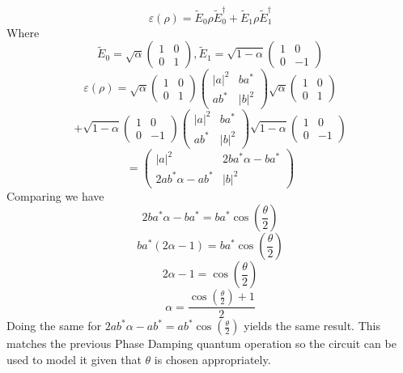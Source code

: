 \documentclass[12pt]{article}
\begin{document}
\begin{enumerate}
    $$ \varepsilon (\rho) = \tilde{E}_0 \rho \tilde{E}^{\dagger}_0 + \tilde{E}_1 \rho \tilde{E}_1^{\dagger} $$
    Where 
    $$ \tilde{E}_0 = \sqrt{\alpha} \left(\begin{array}{cc} 1 & 0 \\  0& 1 \end{array}\right),\tilde{E}_1 = \sqrt{1-\alpha} \left(\begin{array}{cc} 1 & 0 \\  0& -1 \end{array}\right)$$
    $$ \varepsilon (\rho) =  \sqrt{\alpha} \left(\begin{array}{cc} 1 & 0 \\  0& 1 \end{array}\right) \left(\begin{array}{cc} |a|^2 & ba^*  \\  ab^*  & |b|^2 \end{array}\right)  \sqrt{\alpha} \left(\begin{array}{cc} 1 & 0 \\  0& 1 \end{array}\right) $$
    $$ + \sqrt{1-\alpha} \left(\begin{array}{cc} 1 & 0 \\  0& -1 \end{array}\right)   \left(\begin{array}{cc} |a|^2 & ba^*  \\  ab^*  & |b|^2 \end{array}\right)    \sqrt{1-\alpha} \left(\begin{array}{cc} 1 & 0 \\  0& -1 \end{array}\right) $$
    $$ =  \left(\begin{array}{cc} |a|^2  & 2ba^* \alpha - ba^* \\  2ab^* \alpha -ab^*& |b|^2 \end{array}\right) $$
    Comparing we have 
    $$ 2 ba^* \alpha - ba^* = ba^* \cos (\frac{\theta}{2}) $$
    $$ ba^* (2 \alpha -1) = ba^* \cos (\frac{\theta}{2}) $$
    $$ 2 \alpha -1 = \cos (\frac{\theta}{2}) $$
    $$ \alpha = \frac{\cos(\frac{\theta}{2} ) +1 }{2} $$
    Doing the same for $2ab^* \alpha -ab^* = ab^* \cos (\frac{\theta}{2}) $ yields the same result. This matches the previous Phase Damping quantum operation so the circuit can be used to model it given that $\theta$ is chosen appropriately. 


\end{enumerate}
\end{document}

